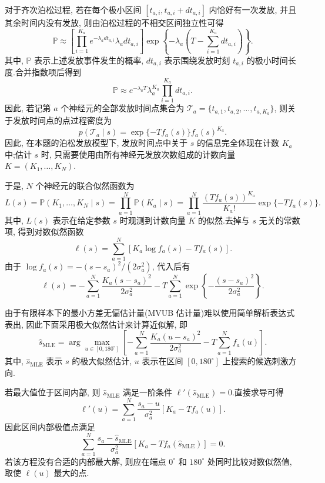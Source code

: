 ﻿\documentclass[UTF8,  zihao=-4]{ctexart}
\begin{document}
对于齐次泊松过程, 若在每个极小区间 $[t_{a,  i},  t_{a,  i}+dt_{a,  i}]$ 内恰好有一次发放, 并且其余时间内没有发放, 则由泊松过程的不相交区间独立性可得
\[
    \mathbb P
    \approx
    \left[
    \prod_{i=1}^{K_a}
    e^{-\lambda_a dt_{a,  i}}\lambda_a dt_{a,  i}
    \right]
    \exp\left\{
    -\lambda_a\left(T-\sum_{i=1}^{K_a}dt_{a,  i}\right)
    \right\}.
\]
其中, $\mathbb P$ 表示上述发放事件发生的概率, $dt_{a,  i}$ 表示围绕发放时刻 $t_{a,  i}$ 的极小时间长度.合并指数项后得到
\[
    \mathbb P
    \approx
    e^{-\lambda_a T}\lambda_a^{K_a}
    \prod_{i=1}^{K_a}dt_{a,  i}.
\]
因此, 若记第 $a$ 个神经元的全部发放时间点集合为 $\mathcal T_a = \{t_{a,  1},  t_{a,  2},  \ldots,  t_{a,  K_a}\}$, 则关于发放时间点的点过程密度为
\[
    p(\mathcal T_a\mid s)
    =
    \exp\{-Tf_a(s)\}f_a(s)^{K_a}.
\]
因此, 在本题的泊松发放模型下, 发放时间点中关于 $s$ 的信息完全体现在计数 $K_a$ 中;估计 $s$ 时, 只需要使用由所有神经元发放次数组成的计数向量 $K=(K_1, \ldots,  K_N)$.

于是, $N$ 个神经元的联合似然函数为
\[
    L(s)
    = 
    \mathbb P(K_1, \ldots,  K_N\mid s)
    =
    \prod_{a=1}^N
    \mathbb P(K_a\mid s)
    = \prod_{a=1}^N
    \frac{(Tf_a(s))^{K_a}}{K_a!}
    \exp\{-Tf_a(s)\}.
\]
其中, $L(s)$ 表示在给定参数 $s$ 时观测到计数向量 $K$ 的似然.去掉与 $s$ 无关的常数项, 得到对数似然函数
\[
    \ell(s)
    =
    \sum_{a=1}^N
    \left[
    K_a\log f_a(s)-Tf_a(s)
    \right].
\]
由于 $\log f_a(s)=-(s-s_a)^2/(2\sigma_a^2)$, 代入后有
\[
    \ell(s)
    =
    -\sum_{a=1}^N
    \frac{K_a(s-s_a)^2}{2\sigma_a^2}
    -
    T\sum_{a=1}^N
    \exp\left\{
    -\frac{(s-s_a)^2}{2\sigma_a^2}
    \right\}.
\]

由于有限样本下的最小方差无偏估计量(MVUB 估计量)难以使用简单解析表达式表出, 因此下面采用极大似然估计来计算近似解, 即
\[
    \hat s_{\mathrm{MLE}}
    =
    \arg\max_{u\in[0,  180^\circ]}
    \left[
    -\sum_{a=1}^N
    \frac{K_a(u-s_a)^2}{2\sigma_a^2}
    -
    T\sum_{a=1}^N
    f_a(u)
    \right].
\]
其中, $\hat s_{\mathrm{MLE}}$ 表示 $s$ 的极大似然估计, $u$ 表示在区间 $[0,  180^\circ]$ 上搜索的候选刺激方向.

若最大值位于区间内部, 则 $\hat s_{\mathrm{MLE}}$ 满足一阶条件 $\ell'(\hat s_{\mathrm{MLE}})=0$.直接求导可得
\[
    \ell'(u)
    =
    \sum_{a=1}^N
    \frac{s_a-u}{\sigma_a^2}
    \left[
    K_a-Tf_a(u)
    \right].
\]
因此区间内部极值点满足
\[
    \sum_{a=1}^N
    \frac{s_a-\hat s_{\mathrm{MLE}}}{\sigma_a^2}
    \left[
    K_a-Tf_a(\hat s_{\mathrm{MLE}})
    \right]
    =
    0.
\]
若该方程没有合适的内部最大解, 则应在端点 $0^\circ$ 和 $180^\circ$ 处同时比较对数似然值, 取使 $\ell(u)$ 最大的点.
\end{document}
